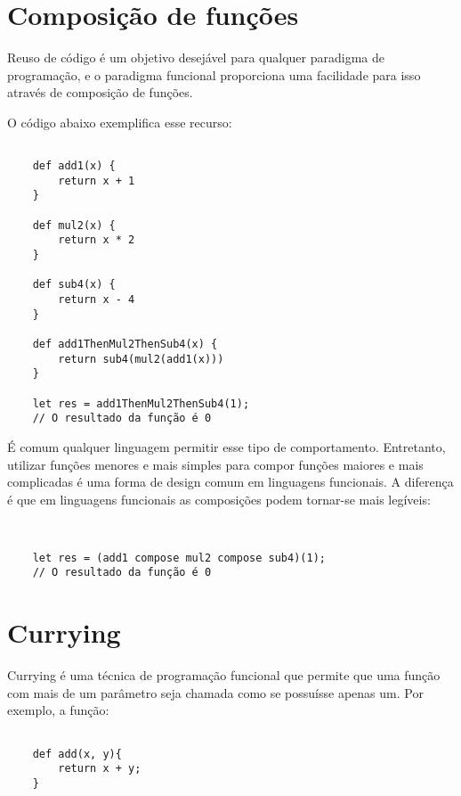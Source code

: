 \section{Composição de funções}

Reuso de código é um objetivo desejável para qualquer 
paradigma de programação, e o paradigma funcional 
proporciona uma facilidade para isso através de 
composição de funções.

O código abaixo exemplifica esse recurso:

\begin{lstlisting}[caption={Exemplo de Composição de Funções},label=fogex]

    def add1(x) {
        return x + 1
    }

    def mul2(x) {
        return x * 2
    }

    def sub4(x) {
        return x - 4
    }

    def add1ThenMul2ThenSub4(x) {
        return sub4(mul2(add1(x)))
    }

    let res = add1ThenMul2ThenSub4(1);
    // O resultado da função é 0

\end{lstlisting}

É comum qualquer linguagem permitir esse tipo 
de comportamento. Entretanto, 
utilizar funções menores e mais simples para compor 
funções maiores e mais complicadas é uma forma de 
design comum em linguagens funcionais. A diferença é 
que em linguagens funcionais as composições podem 
tornar-se mais legíveis:

\begin{lstlisting}[caption={Exemplo de Composição de Funções},label=fogex]


    let res = (add1 compose mul2 compose sub4)(1);
    // O resultado da função é 0

\end{lstlisting}


\section{Currying}

Currying é uma técnica de programação funcional que 
permite que uma função com mais de um parâmetro seja 
chamada como se possuísse apenas um. \cite{realworldhaskell} \cite{functionalscala} Por exemplo, a 
função:

\begin{lstlisting}[caption={Exemplo sem Currying},label=nocurrex]

    def add(x, y){
        return x + y;
    }

\end{lstlisting}

